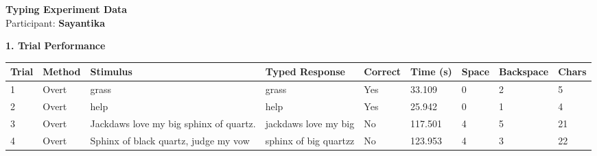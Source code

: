 \documentclass[10pt,a4paper]{article}
\begin{document}

\begin{center}
    {\Large\bfseries Typing Experiment Data}\\
    \vspace{2pt}
    Participant: \textbf{Sayantika}
\end{center}

\vspace{0.25cm}


\noindent
{\large\bfseries 1. Trial Performance}

\vspace{0.08cm}

\begin{center}
\begin{tabularx}{\textwidth}{
    C{0.45in}
    C{0.65in}
    L{2.35in}
    L{2.55in}
    C{0.65in}
    C{0.65in}
    C{0.55in}
    C{0.75in}
    C{0.55in}
}
\toprule

\textbf{Trial} &
\textbf{Method} &
\textbf{Stimulus} &
\textbf{Typed Response} &
\textbf{Correct} &
\textbf{Time (s)} &
\textbf{Space} &
\textbf{Backspace} &
\textbf{Chars}
\\

\midrule

1 &
Overt &
grass &
grass &
Yes &
33.109 &
0 &
2 &
5
\\

2 &
Overt &
help &
help &
Yes &
25.942 &
0 &
1 &
4
\\

3 &
Overt &
Jackdaws love my big sphinx of quartz. &
jackdaws love my  big &
No &
117.501 &
4 &
5 &
21
\\

4 &
Overt &
Sphinx of black quartz, judge my vow &
sphinx of  big quartzz &
No &
123.953 &
4 &
3 &
22
\\

\bottomrule
\end{tabularx}
\end{center}

\vspace{0.35cm}

\end{document}
